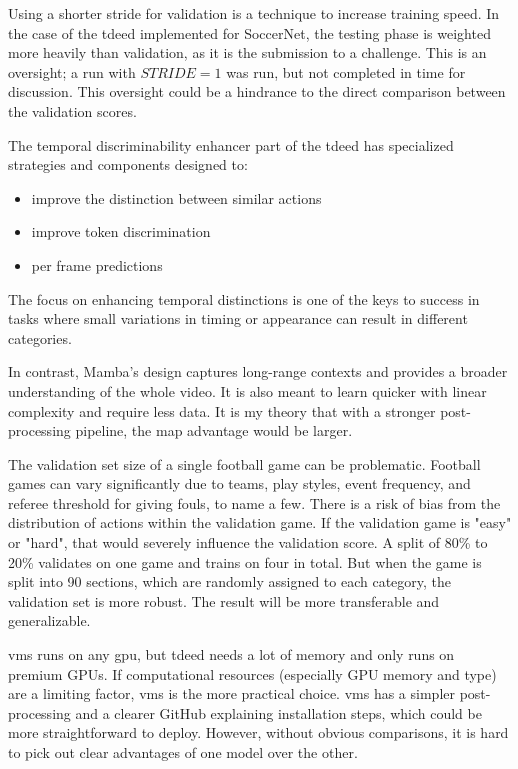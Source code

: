 Using a shorter stride for validation is a technique to increase training speed. In the case of the \acrshort{tdeed} implemented for SoccerNet, the testing phase is weighted more heavily than validation, as it is the submission to a challenge. This is an oversight; a run with \(STRIDE=1\) was run, but not completed in time for discussion. This oversight could be a hindrance to the direct comparison between the validation scores.


The temporal discriminability enhancer part of the \acrfull{tdeed} has specialized strategies and components designed to:
\begin{itemize}
    \item improve the distinction between similar actions
    \item improve token discrimination
    \item per frame predictions
\end{itemize}

The focus on enhancing temporal distinctions is one of the keys to success in tasks where small variations in timing or appearance can result in different categories. 

In contrast, Mamba's design captures long-range contexts and provides a broader understanding of the whole video. It is also meant to learn quicker with linear complexity and require less data. It is my theory that with a stronger post-processing pipeline, the \acrshort{map} advantage would be larger. 

The validation set size of a single football game can be problematic. Football games can vary significantly due to teams, play styles, event frequency, and referee threshold for giving fouls, to name a few. There is a risk of bias from the distribution of actions within the validation game. If the validation game is "easy" or "hard", that would severely influence the validation score. A split of 80\% to 20\% validates on one game and trains on four in total. But when the game is split into 90 sections, which are randomly assigned to each category, the validation set is more robust. The result will be more transferable and generalizable. 

\acrshort{vms} runs on any \acrshort{gpu}, but \acrshort{tdeed} needs a lot of memory and only runs on premium GPUs. If computational resources (especially GPU memory and type) are a limiting factor, \acrshort{vms} is the more practical choice. \acrshort{vms} has a simpler post-processing and a clearer GitHub explaining installation steps, which could be more straightforward to deploy. However, without obvious comparisons, it is hard to pick out clear advantages of one model over the other. 

